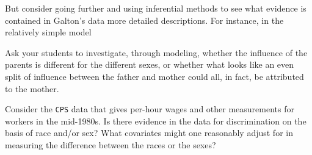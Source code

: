 But consider going further and using inferential methods to see what
evidence is contained in Galton's data more detailed descriptions.
For instance, in the relatively simple model
\begin{knitrout}
\end{knitrout}


Ask your students to investigate, through modeling, whether the
influence of the parents is different for the different sexes, or
whether what looks like an even split of influence between the father
and mother could all, in fact, be attributed to the mother.

\begin{problem}
Consider the \texttt{CPS} data that gives per-hour wages and
  other measurements for workers in the mid-1980s.  Is there evidence in the data for
  discrimination on the basis of race and/or sex?  What covariates
  might one reasonably adjust for in measuring the difference between
  the races or the sexes?
\end{problem}
  

\shipoutProblems


